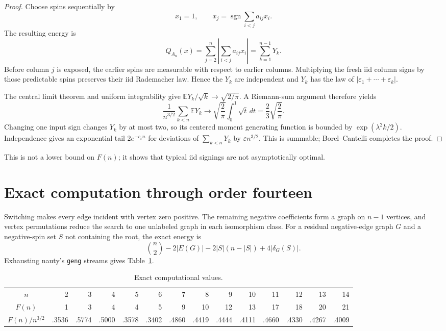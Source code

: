 \documentclass[11pt]{article}
\newcommand{\E}{\mathbb E}
\begin{document}
\begin{proof}
Choose spins sequentially by
\[
 x_1=1,\qquad x_j=\operatorname{sgn}\sum_{i<j}a_{ij}x_i.
\]
The resulting energy is
\[
 Q_{A_n}(x)=\sum_{j=2}^n
 \left|\sum_{i<j}a_{ij}x_i\right|=\sum_{k=1}^{n-1}Y_k.
\]
Before column \(j\) is exposed, the earlier spins are measurable with respect
to earlier columns.  Multiplying the fresh iid column signs by those
predictable spins preserves their iid Rademacher law.  Hence the \(Y_k\) are
independent and \(Y_k\) has the law of
\(|\varepsilon_1+\cdots+\varepsilon_k|\).

The central limit theorem and uniform integrability give
\(\E Y_k/\sqrt k\to\sqrt{2/\pi}\).  A Riemann-sum argument therefore yields
\[
 \frac1{n^{3/2}}\sum_{k<n}\E Y_k
 \longrightarrow \sqrt{\frac2\pi}\int_0^1\sqrt t\,dt
 =\frac23\sqrt{\frac2\pi}.
\]
Changing one input sign changes \(Y_k\) by at most two, so its centered moment
generating function is bounded by \(\exp(\lambda^2k/2)\).  Independence gives
an exponential tail \(2e^{-c_\varepsilon n}\) for deviations of
\(\sum_{k<n}Y_k\) by \(\varepsilon n^{3/2}\).  This is summable; Borel--Cantelli
completes the proof.
\end{proof}

This is not a lower bound on \(F(n)\); it shows that typical iid signings are
not asymptotically optimal.

\section{Exact computation through order fourteen}

Switching makes every edge incident with vertex zero positive.  The remaining
negative coefficients form a graph on \(n-1\) vertices, and vertex
permutations reduce the search to one unlabeled graph in each isomorphism
class.  For a residual negative-edge graph \(G\) and a negative-spin set
\(S\) not containing the root, the exact energy is
\[
 \binom n2-2|E(G)|-2|S|(n-|S|)+4|\delta_G(S)|.
\]
Exhausting nauty's \texttt{geng} streams gives Table~\ref{tab:values}.

\begin{table}[ht]
\centering
\caption{Exact computational values.}
\label{tab:values}
\small
\setlength{\tabcolsep}{3.5pt}
\begin{tabular}{c*{13}{r}}
\toprule
\(n\) & 2&3&4&5&6&7&8&9&10&11&12&13&14\\
\(F(n)\) & 1&3&4&4&5&9&10&12&13&17&18&20&21\\
\(F(n)/n^{3/2}\) & .3536&.5774&.5000&.3578&.3402&.4860&.4419&.4444&.4111&.4660&.4330&.4267&.4009\\
\bottomrule
\end{tabular}
\end{table}
\end{document}

